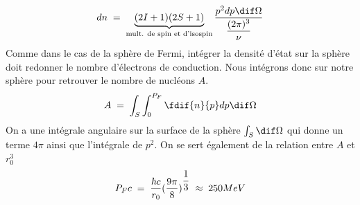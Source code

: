\begin{equation*}
    dn \eq \underbrace{(2I+1)(2S+1)}_{\text{mult. de spin et d'isospin}}\dfrac{p^2dp\dif\Omega}{\dfrac{(2\pi)^3}{\nu}}
\end{equation*}
Comme dans le cas de la sphère de Fermi, intégrer la densité d'état sur la sphère doit redonner le nombre d'électrons de conduction. Nous intégrons donc sur notre sphère pour retrouver le nombre de nucléons $A$.
\begin{equation*}
    A\eq \int_S\int_0^{P_F} \fdif{n}{p}dp\dif\Omega
\end{equation*}
On a une intégrale angulaire sur la surface de la sphère $\int_S \dif\Omega$ qui donne un terme $4\pi$ ainsi que l'intégrale de $p^2$. On se sert également de la relation entre $A$ et $r_0^3$
\[
    P_F c \; = \; \dfrac{\hbar c}{r_0}(\dfrac{9\pi}{8})^{\dfrac{1}{3}}\; \approx \; 250MeV
\]

